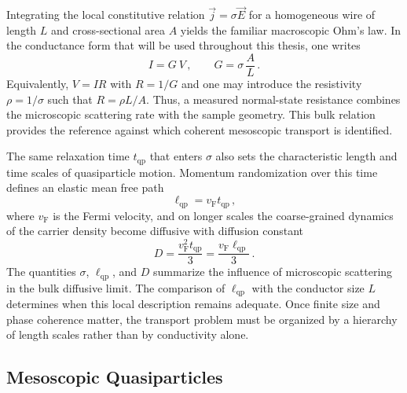             Integrating the local constitutive relation $\vec{j}=\sigma\vec{E}$ for a homogeneous wire of length $L$ and cross-sectional area $A$ yields the familiar macroscopic Ohm's law. In the conductance form that will be used throughout this thesis, one writes
            \begin{equation}
                I = G \ V\,,\qquad
                G = \sigma\,\frac{A}{L}\,.
                \label{eq:basics:ohms-law}
            \end{equation}
            Equivalently, $V=IR$ with $R = 1/G$ and one may introduce the resistivity $\rho= 1/\sigma$ such that $R=\rho L/A$. Thus, a measured normal-state resistance combines the microscopic scattering rate with the sample geometry. This bulk relation provides the reference against which coherent mesoscopic transport is identified. \cite{ohm_galvanische_1827}

            The same relaxation time $t_\mathrm{qp}$ that enters $\sigma$ also sets the characteristic length and time scales of quasiparticle motion. Momentum randomization over this time defines an elastic mean free path
            \begin{equation}
                \ell_\mathrm{qp}= v_\mathrm{F} t_\mathrm{qp}\,,
                \label{eq:basics:mean-free-path}
            \end{equation}
            where $v_\mathrm{F}$ is the Fermi velocity, and on longer scales the coarse-grained dynamics of the carrier density become diffusive with diffusion constant
            \begin{equation}
                D = \frac{v_\mathrm{F}^{2} t_\mathrm{qp}}{3} = \frac{v_\mathrm{F}\ell_\mathrm{qp}}{3}\,.
                \label{eq:basics:diffusion-constant}
            \end{equation}
            The quantities $\sigma$, $\ell_\mathrm{qp}$, and $D$ summarize the influence of microscopic scattering in the bulk diffusive limit. The comparison of $\ell_\mathrm{qp}$ with the conductor size $L$ determines when this local description remains adequate. Once finite size and phase coherence matter, the transport problem must be organized by a hierarchy of length scales rather than by conductivity alone. \cite{drude_zur_1900}
                
    \newpage
    \subsection{Mesoscopic Quasiparticles}
    \label{subsec:basics:meso}

